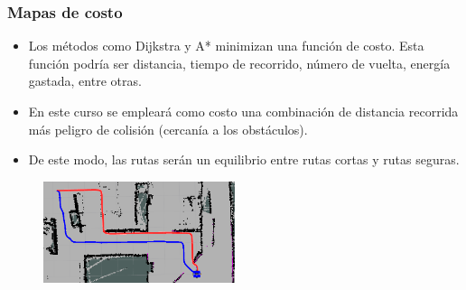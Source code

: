 \documentclass[10pt,spanish,aspectratio=1610]{beamer}
\begin{document}
\begin{frame}\frametitle{Mapas de costo}
  \begin{itemize}
  \item Los métodos como Dijkstra y A* minimizan una función de costo. Esta función podría ser distancia, tiempo de recorrido, número de vuelta, energía gastada, entre otras.
  \item En este curso se empleará como costo una combinación de distancia recorrida más peligro de colisión (cercanía a los obstáculos).
  \item De este modo, las rutas serán un equilibrio entre rutas cortas y rutas seguras.
  \end{itemize}
  \begin{figure}
    \centering
    \includegraphics[width=0.5\textwidth]{Figures/AStarComparison.png}
  \end{figure}
\end{frame}
\end{document}
